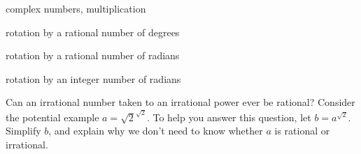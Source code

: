 \documentclass[../gatm_answers.tex]{subfiles}
\begin{document}
\begin{inner_problem}
\item complex numbers, multiplication
\end{inner_problem}

\begin{inner_problem}
\item rotation by a rational number of degrees
\end{inner_problem}

\begin{inner_problem}
\item rotation by a rational number of radians
\end{inner_problem}

\begin{inner_problem}
\item rotation by an integer number of radians
\end{inner_problem}

\begin{outer_problem}
\item Can an irrational number taken to an irrational power ever be rational? Consider the potential example $a = \sqrt{2}^{\sqrt{2}}$. To help you answer this question, let $b = a^{\sqrt{2}}$. Simplify $b$, and explain why we don’t need to know whether $a$ is rational or irrational.
\end{outer_problem}
\end{document}
